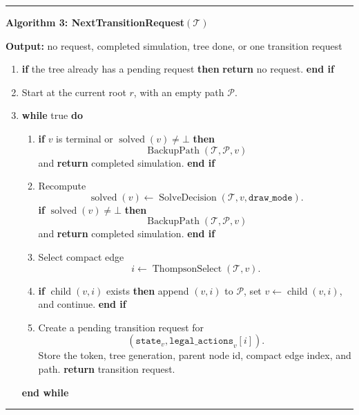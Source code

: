 \documentclass[11pt]{article}
\newcommand{\Tree}{\mathcal{T}}
\newcommand{\Path}{\mathcal{P}}
\newcommand{\Child}{\operatorname{child}}
\newcommand{\Solved}{\operatorname{solved}}
\newcommand{\SolveDecision}{\operatorname{SolveDecision}}
\newcommand{\ThompsonSelect}{\operatorname{ThompsonSelect}}
\newcommand{\BackupPath}{\operatorname{BackupPath}}
\newenvironment{algorithmblock}[1]
{
  \par\medskip
  \noindent\hrule\par\smallskip
  \noindent\textbf{#1}
  \par\smallskip
}
{
  \par\smallskip\noindent\hrule\par\medskip
}
\newcommand{\Output}{\textbf{Output: }}
\newcommand{\Return}{\textbf{return }}
\newcommand{\If}{\textbf{if }}
\newcommand{\Then}{\textbf{ then }}
\newcommand{\EndIf}{\textbf{end if}}
\newcommand{\While}{\textbf{while }}
\newcommand{\EndWhile}{\textbf{end while}}
\newcommand{\Do}{\textbf{ do }}
\begin{document}
\begin{algorithmblock}{Algorithm 3: NextTransitionRequest\((\Tree)\)}

\Output no request, completed simulation, tree done, or one transition request

\begin{enumerate}[leftmargin=2em]
  \item \If the tree already has a pending request \Then \Return no request.
  \EndIf

  \item Start at the current root \(r\), with an empty path \(\Path\).

  \item \While true \Do
  \begin{enumerate}[leftmargin=2em]
    \item \If \(v\) is terminal or \(\Solved(v)\ne\bot\) \Then
    \[
    \BackupPath(\Tree,\Path,v)
    \]
    and \Return completed simulation. \EndIf

    \item Recompute
    \[
    \Solved(v)\gets\SolveDecision(\Tree,v,\texttt{draw\_mode}).
    \]
    \If \(\Solved(v)\ne\bot\) \Then
    \[
    \BackupPath(\Tree,\Path,v)
    \]
    and \Return completed simulation. \EndIf

    \item Select compact edge
    \[
    i\gets\ThompsonSelect(\Tree,v).
    \]

    \item \If \(\Child(v,i)\) exists \Then append \((v,i)\) to \(\Path\), set
    \(v\gets\Child(v,i)\), and continue. \EndIf

    \item Create a pending transition request for
    \[
    (\texttt{state}_v,\texttt{legal\_actions}_v[i]).
    \]
    Store the token, tree generation, parent node id, compact edge index, and
    path. \Return transition request.
  \end{enumerate}
  \EndWhile
\end{enumerate}

\end{algorithmblock}
\end{document}
